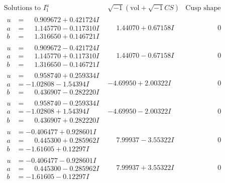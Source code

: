 \documentclass[1p]{elsarticle_modified}
\theoremstyle{definition}
\newcommand{\I}{\sqrt{-1}}
\begin{document}
$$\begin{array}{c|c|c}  
\text{Solutions to }I^u_{1}& \I (\text{vol} + \sqrt{-1}CS) & \text{Cusp shape}\\
 \hline 
\begin{aligned}
u &= \phantom{-}0.909672 + 0.421724 I \\
a &= \phantom{-}1.145770 - 0.117310 I \\
b &= \phantom{-}1.316650 + 0.146721 I\end{aligned}
 & \phantom{-}1.44070 + 0.67158 I & \phantom{-0.000000 } 0 \\ \hline\begin{aligned}
u &= \phantom{-}0.909672 - 0.421724 I \\
a &= \phantom{-}1.145770 + 0.117310 I \\
b &= \phantom{-}1.316650 - 0.146721 I\end{aligned}
 & \phantom{-}1.44070 - 0.67158 I & \phantom{-0.000000 } 0 \\ \hline\begin{aligned}
u &= \phantom{-}0.958740 + 0.259334 I \\
a &= -1.02808 - 1.54394 I \\
b &= \phantom{-}0.436907 - 0.282220 I\end{aligned}
 & -4.69950 + 2.00322 I & \phantom{-0.000000 } 0 \\ \hline\begin{aligned}
u &= \phantom{-}0.958740 - 0.259334 I \\
a &= -1.02808 + 1.54394 I \\
b &= \phantom{-}0.436907 + 0.282220 I\end{aligned}
 & -4.69950 - 2.00322 I & \phantom{-0.000000 } 0 \\ \hline\begin{aligned}
u &= -0.406477 + 0.928601 I \\
a &= \phantom{-}0.445300 + 0.285962 I \\
b &= -1.61605 + 0.12297 I\end{aligned}
 & \phantom{-}7.99937 - 3.55322 I & \phantom{-0.000000 } 0 \\ \hline\begin{aligned}
u &= -0.406477 - 0.928601 I \\
a &= \phantom{-}0.445300 - 0.285962 I \\
b &= -1.61605 - 0.12297 I\end{aligned}
 & \phantom{-}7.99937 + 3.55322 I & \phantom{-0.000000 } 0 \\ \hline\begin{aligned}

\end{aligned}
\end{array}$$
\end{document}
